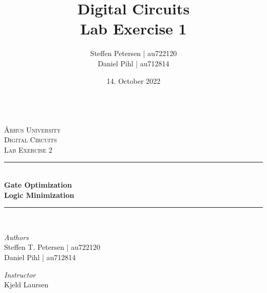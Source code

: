 \documentclass{article}
\title{\Huge Digital Circuits\\\LARGE Lab Exercise 1}
\author{Steffen Petersen | au722120 \\ Daniel Pihl | au712814}
\date{14. October 2022}
\begin{document}

\begin{titlepage} %
  \newcommand{\HRule}{\rule{\linewidth}{0.5mm}} %

    \center %
    
    \textbf{\space}\\[2cm]   
    \textsc{\LARGE Århus University}\\[1.5cm] %
    
    \textsc{\Large Digital Circuits}\\[0.5cm] %
    
    \textsc{\large Lab Exercise 2}\\[0.5cm] %
    
    
    \HRule\\[0cm]
    
    {\huge\bfseries Gate Optimization \\[0.1cm]}
    {\large\bfseries Logic Minimization\\}
    
    \HRule\\[1.5cm]
    
    
    \begin{minipage}{0.4\textwidth}
      \begin{flushleft}
        \large
        \textit{Authors}\\
        Steffen T. Petersen | au722120\\
        Daniel Pihl | au712814
      \end{flushleft}
    \end{minipage}
    \begin{minipage}{0.4\textwidth}
      \begin{flushright}
        \large\vspace{-4mm}
        \textit{Instructor}\\
        Kjeld Laursen
      \end{flushright}
    \end{minipage}
    

\end{titlepage}
\end{document}
